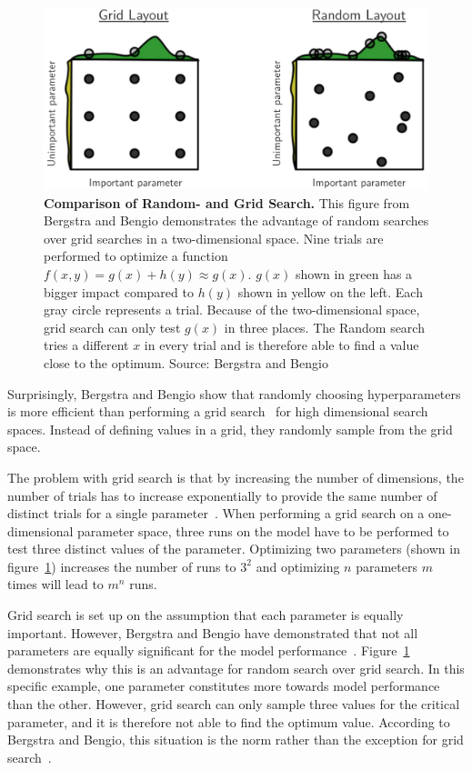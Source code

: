 \begin{figure}[htb]
    \centering
    \includegraphics[scale=0.35]{figures/03_theory/03_randomSearch}
    \caption{\textbf{Comparison of Random- and Grid Search.} This figure from Bergstra and Bengio demonstrates the advantage of random searches over grid searches in a two-dimensional space. Nine trials are performed to optimize a function $f(x, y) = g(x) + h(y) \approx g(x)$. $g(x)$ shown in green has a bigger impact compared to $h(y)$ shown in yellow on the left. Each gray circle represents a trial. Because of the two-dimensional space, grid search can only test $g(x)$ in three places. The Random search tries a different $x$ in every trial and is therefore able to find a value close to the optimum. Source: Bergstra and Bengio~\cite{Bergstra2012a}}
    \label{fig:03_randomSearch}
\end{figure}

Surprisingly, Bergstra and Bengio show that randomly choosing hyperparameters is more efficient than performing a grid search~\cite{Bergstra2012a} for high dimensional search spaces. Instead of defining values in a grid, they randomly sample from the grid space.

The problem with grid search is that by increasing the number of dimensions, the number of trials has to increase exponentially to provide the same number of distinct trials for a single parameter~\cite{Bergstra2012a}. When performing a grid search on a one-dimensional parameter space, three runs on the model have to be performed to test three distinct values of the parameter. Optimizing two parameters {(shown in figure~\ref{fig:03_randomSearch})} increases the number of runs to $3^2$ and optimizing $n$ parameters $m$ times will lead to $m^n$ runs. 

Grid search is set up on the assumption that each parameter is equally important. However, Bergstra and Bengio have demonstrated that not all parameters are equally significant for the model performance~\cite{Bergstra2012a}. Figure~\ref{fig:03_randomSearch} demonstrates why this is an advantage for random search over grid search. In this specific example, one parameter constitutes more towards model performance than the other. However, grid search can only sample three values for the critical parameter, and it is therefore not able to find the optimum value. According to Bergstra and Bengio, this situation is the norm rather than the exception for grid search~\cite{Bergstra2012a}.

